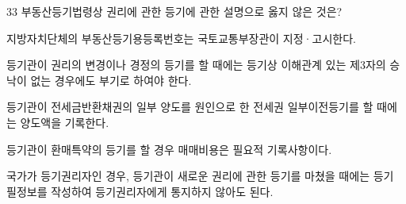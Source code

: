 \begin{question}{33}
부동산등기법령상 권리에 관한 등기에 관한 설명으로 옳지 않은 것은?
\begin{choices}
  \item 지방자치단체의 부동산등기용등록번호는 국토교통부장관이 지정·고시한다.
  \item 등기관이 권리의 변경이나 경정의 등기를 할 때에는 등기상 이해관계 있는 제3자의 승낙이 없는 경우에도 부기로 하여야 한다.
  \item 등기관이 전세금반환채권의 일부 양도를 원인으로 한 전세권 일부이전등기를 할 때에는 양도액을 기록한다.
  \item 등기관이 환매특약의 등기를 할 경우 매매비용은 필요적 기록사항이다.
  \item 국가가 등기권리자인 경우, 등기관이 새로운 권리에 관한 등기를 마쳤을 때에는 등기 필정보를 작성하여 등기권리자에게 통지하지 않아도 된다.
\end{choices}
\end{question}
